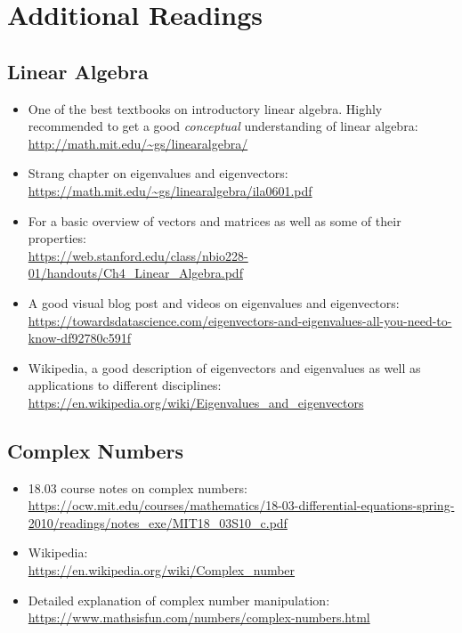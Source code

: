 \documentclass[11pt]{article} %
\begin{document}

\newpage
\section{Additional Readings}
\subsection{Linear Algebra}
\begin{itemize}
    \item One of the best textbooks on introductory linear algebra. Highly recommended to get a good \textit{conceptual} understanding of linear algebra:\\
    {\footnotesize \url{http://math.mit.edu/~gs/linearalgebra/}}
    \item Strang chapter on eigenvalues and eigenvectors:\\ {\footnotesize \url{https://math.mit.edu/~gs/linearalgebra/ila0601.pdf}}
    \item For a basic overview of vectors and matrices as well as some of their properties:\\ {\footnotesize\url{https://web.stanford.edu/class/nbio228-01/handouts/Ch4_Linear_Algebra.pdf}}
    \item A good visual blog post and videos on eigenvalues and eigenvectors:\\ {\footnotesize \url{https://towardsdatascience.com/eigenvectors-and-eigenvalues-all-you-need-to-know-df92780c591f}}
    \item Wikipedia, a good description of eigenvectors and eigenvalues as well as applications to different disciplines: \\ {\footnotesize \url{https://en.wikipedia.org/wiki/Eigenvalues_and_eigenvectors}} 
    
    
\end{itemize}

\subsection{Complex Numbers}
\begin{itemize}
    \item 18.03 course notes on complex numbers:\\ {\footnotesize \url{https://ocw.mit.edu/courses/mathematics/18-03-differential-equations-spring-2010/readings/notes_exe/MIT18_03S10_c.pdf}}
    \item Wikipedia: \\ {\footnotesize \url{https://en.wikipedia.org/wiki/Complex\_number}}
    \item Detailed explanation of complex number manipulation: \\
    {\footnotesize \url{https://www.mathsisfun.com/numbers/complex-numbers.html}}
\end{itemize}
\end{document}
